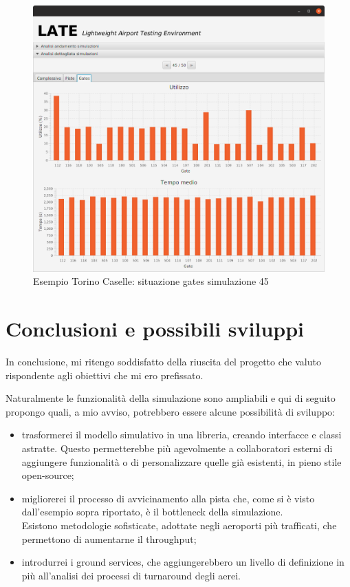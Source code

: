 \documentclass[a4paper, 12pt]{article}
\begin{document}
\begin{figure}[H]
\caption{Esempio Torino Caselle: situazione gates simulazione 45}
 \label{fig:caselle45GT}
\hfill \includegraphics[height=0.44\textheight]{resources/images/Risultati_06.png}\hspace*{\fill}
\end{figure}


\newpage



\section{Conclusioni e possibili sviluppi}

In conclusione, mi ritengo soddisfatto della riuscita del progetto che valuto rispondente agli obiettivi che mi ero prefissato. 

Naturalmente le funzionalità della simulazione sono ampliabili e qui di seguito propongo quali, a mio avviso, potrebbero essere alcune possibilità di sviluppo:
\begin{itemize}
\item trasformerei il modello simulativo in una libreria, creando interfacce e classi astratte. Questo permetterebbe più agevolmente a collaboratori esterni di aggiungere funzionalità o di personalizzare quelle già esistenti, in pieno stile open-source;

\item migliorerei il processo di avvicinamento alla pista che, come si è visto dall'esempio sopra riportato, è il bottleneck della simulazione. \\Esistono metodologie sofisticate, adottate negli aeroporti più trafficati, che permettono di aumentarne il throughput;

\item introdurrei i ground services, che aggiungerebbero un livello di definizione in più all'analisi dei processi di turnaround degli aerei.


\end{itemize}
\end{document}

